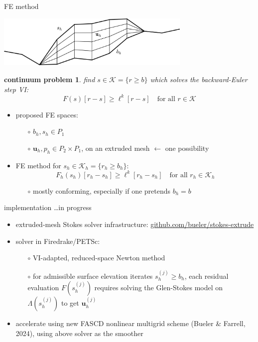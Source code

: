\documentclass[10pt,svgnames]{beamer}
\newtheorem*{cproblem}{continuum problem}
\newcommand{\bu}{\mathbf{u}}
\newcommand{\cK}{\mathcal{K}}
\begin{document}
\begin{frame}{FE method}

\begin{center}
\includegraphics[width=0.7\textwidth]{extruded}
\end{center}

\begin{cproblem}
find $s\in\cK = \{r \ge b\}$ which solves the backward-Euler step VI:
   $$F(s)[r-s] \ge \ell^k[r-s] \quad \text{for all } r \in \cK$$
\end{cproblem}

\begin{itemize}
\item proposed FE spaces:
   \begin{itemize}
   \item[$\circ$] $b_h,s_h \in P_1$
   \item[$\circ$] $\bu_h,p_h \in P_2 \times P_1$, on an extruded mesh \hfill {\scriptsize $\leftarrow$ one possibility}
   \end{itemize}
\item FE method for $s_h\in\cK_h = \{r_h \ge b_h\}$:
   $$F_h(s_h)[r_h-s_h] \ge \ell^k[r_h-s_h] \quad \text{for all } r_h \in \cK_h$$

   \begin{itemize}
   \item[$\circ$] mostly conforming, especially if one pretends $b_h=b$
   \end{itemize}
\end{itemize}

\phantom{x}
\end{frame}


\begin{frame}{implementation \alert{\dots in progress}}

\begin{itemize}
\item extruded-mesh Stokes solver infrastructure: \href{https://github.com/bueler/stokes-extrude}{github.com/bueler/stokes-extrude}
\item solver in Firedrake/PETSc:
    \begin{itemize}
    \item[$\circ$] VI-adapted, reduced-space Newton method
    \item[$\circ$] for admissible surface elevation iterates $s_h^{(j)} \ge b_h$, \alert{each residual evaluation $F(s_h^{(j)})$ requires solving the Glen-Stokes model on $\Lambda(s_h^{(j)})$ to get $\bu_h^{(j)}$}
    \end{itemize}
\item accelerate using new FASCD nonlinear multigrid scheme (Bueler \& Farrell, 2024), using above solver as the smoother
\end{itemize}

\bigskip
\end{frame}
\end{document}
